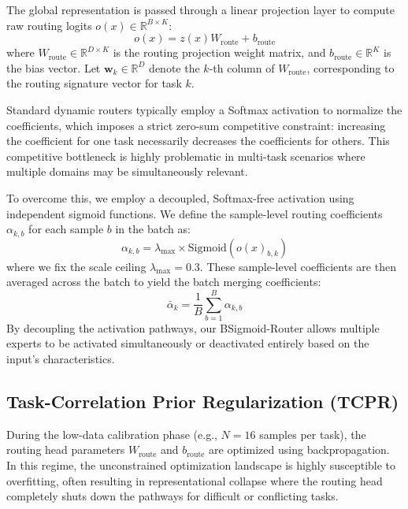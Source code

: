 The global representation is passed through a linear projection layer to compute raw routing logits $o(x) \in \mathbb{R}^{B \times K}$:
\begin{equation}
    o(x) = z(x) W_{\text{route}} + b_{\text{route}}
\end{equation}
where $W_{\text{route}} \in \mathbb{R}^{D \times K}$ is the routing projection weight matrix, and $b_{\text{route}} \in \mathbb{R}^K$ is the bias vector. Let $\mathbf{w}_k \in \mathbb{R}^D$ denote the $k$-th column of $W_{\text{route}}$, corresponding to the routing signature vector for task $k$.

Standard dynamic routers typically employ a Softmax activation to normalize the coefficients, which imposes a strict zero-sum competitive constraint: increasing the coefficient for one task necessarily decreases the coefficients for others. This competitive bottleneck is highly problematic in multi-task scenarios where multiple domains may be simultaneously relevant. 

To overcome this, we employ a decoupled, Softmax-free activation using independent sigmoid functions. We define the sample-level routing coefficients $\alpha_{k, b}$ for each sample $b$ in the batch as:
\begin{equation}
    \alpha_{k, b} = \lambda_{\text{max}} \times \text{Sigmoid}(o(x)_{b, k})
\end{equation}
where we fix the scale ceiling $\lambda_{\text{max}} = 0.3$. These sample-level coefficients are then averaged across the batch to yield the batch merging coefficients:
\begin{equation}
    \bar{\alpha}_k = \frac{1}{B} \sum_{b=1}^B \alpha_{k, b}
\end{equation}
By decoupling the activation pathways, our BSigmoid-Router allows multiple experts to be activated simultaneously or deactivated entirely based on the input's characteristics.

\subsection{Task-Correlation Prior Regularization (TCPR)}
During the low-data calibration phase (e.g., $N=16$ samples per task), the routing head parameters $W_{\text{route}}$ and $b_{\text{route}}$ are optimized using backpropagation. In this regime, the unconstrained optimization landscape is highly susceptible to overfitting, often resulting in representational collapse where the routing head completely shuts down the pathways for difficult or conflicting tasks.

